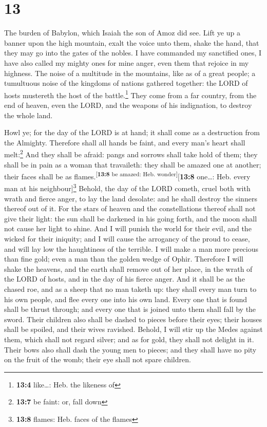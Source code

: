 \hypertarget{section-12}{%
\section{13}\label{section-12}}

 The burden of Babylon, which Isaiah the son of Amoz did
see.  Lift ye up a banner upon the high mountain, exalt
the voice unto them, shake the hand, that they may go into the gates of
the nobles.  I have commanded my sanctified ones, I have
also called my mighty ones for mine anger, even them that rejoice in my
highness.  The noise of a multitude in the mountains, like
as of a great people; a tumultuous noise of the kingdoms of nations
gathered together: the LORD of hosts mustereth the host of the
battle.\footnote{\textbf{13:4} like\ldots: Heb. the likeness of}
 They come from a far country, from the end of heaven,
even the LORD, and the weapons of his indignation, to destroy the whole
land.

 Howl ye; for the day of the LORD is at hand; it shall
come as a destruction from the Almighty.  Therefore shall
all hands be faint, and every man's heart shall melt:\footnote{\textbf{13:7}
  be faint: or, fall down}  And they shall be afraid:
pangs and sorrows shall take hold of them; they shall be in pain as a
woman that travaileth: they shall be amazed one at another; their faces
shall be as flames.\textsuperscript{{[}\textbf{13:8} be amazed: Heb.
wonder{]}}{[}\textbf{13:8} one\ldots: Heb. every man at his
neighbour{]}\footnote{\textbf{13:8} flames: Heb. faces of the flames}
 Behold, the day of the LORD cometh, cruel both with wrath
and fierce anger, to lay the land desolate: and he shall destroy the
sinners thereof out of it.  For the stars of heaven and
the constellations thereof shall not give their light: the sun shall be
darkened in his going forth, and the moon shall not cause her light to
shine.  And I will punish the world for their evil, and
the wicked for their iniquity; and I will cause the arrogancy of the
proud to cease, and will lay low the haughtiness of the terrible.
 I will make a man more precious than fine gold; even a
man than the golden wedge of Ophir.  Therefore I will
shake the heavens, and the earth shall remove out of her place, in the
wrath of the LORD of hosts, and in the day of his fierce anger.
 And it shall be as the chased roe, and as a sheep that
no man taketh up: they shall every man turn to his own people, and flee
every one into his own land.  Every one that is found
shall be thrust through; and every one that is joined unto them shall
fall by the sword.  Their children also shall be dashed
to pieces before their eyes; their houses shall be spoiled, and their
wives ravished.  Behold, I will stir up the Medes against
them, which shall not regard silver; and as for gold, they shall not
delight in it.  Their bows also shall dash the young men
to pieces; and they shall have no pity on the fruit of the womb; their
eye shall not spare children.

